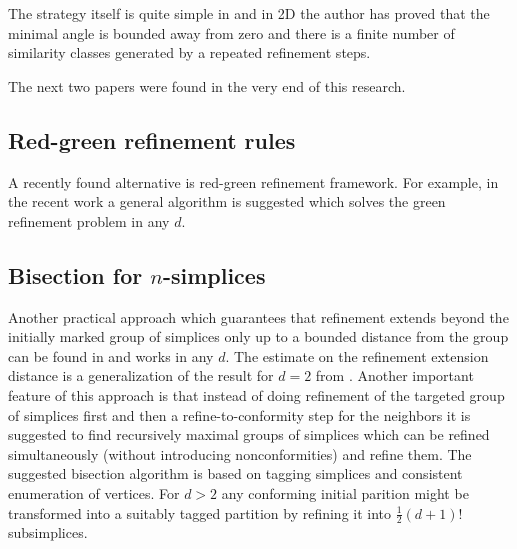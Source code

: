 \documentclass[a4paper,12pt]{amsart}
\numberwithin{equation}{section}
\begin{document}
The strategy itself is quite simple in \cite{rivara} and in 2D the author has proved that the minimal angle is bounded away from zero and there is a finite number of similarity classes generated by a repeated refinement steps.

The next two papers were found in the very end of this research.

\subsection{Red-green refinement rules}
A recently found alternative is red-green refinement framework. For example, in the recent work \cite{grande} a general algorithm is suggested which solves the green refinement problem in any $d$.

\subsection{Bisection for $n$-simplices}
Another practical approach which guarantees that refinement extends beyond the initially marked group of simplices only up to a bounded distance from the group can be found in \cite{stevenson} and works in any $d$. The estimate on the refinement extension distance is a generalization of the result for $d=2$ from \cite{binev_dahmen_devore}.
Another important feature of this approach is that instead of doing refinement of the targeted group of simplices first and then a refine-to-conformity step for the neighbors it is suggested to find recursively maximal groups of simplices which can be refined simultaneously (without introducing nonconformities) and refine them. The suggested bisection algorithm is based on tagging simplices and consistent enumeration of vertices. For $d > 2$ any conforming initial parition might be transformed into a 
suitably tagged partition by refining it into $\frac{1}{2} (d+1)!$ subsimplices.
\end{document}

